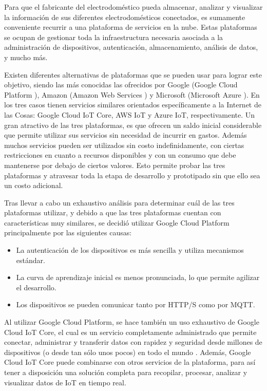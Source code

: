 Para que el fabricante del electrodoméstico pueda almacenar, analizar y visualizar la información de sus diferentes electrodomésticos conectados, es sumamente conveniente recurrir a una plataforma de servicios en la nube. Estas plataformas se ocupan de gestionar toda la infraestructura necesaria asociada a la administración de dispositivos, autenticación, almacenamiento, análisis de datos, y mucho más.

Existen diferentes alternativas de plataformas que se pueden usar para lograr este objetivo, siendo las más conocidas las ofrecidos por Google (Google Cloud Platform \citep{google_cloud_platform}), Amazon (Amazon Web Services \citep{aws}) y Microsoft (Microsoft Azure \citep{microsoft_azure}). En los tres casos tienen servicios similares orientados específicamente a la Internet de las Cosas: Google Cloud IoT Core, AWS IoT y Azure IoT, respectivamente. Un gran atractivo de las tres plataformas, es que ofrecen un saldo inicial considerable que permite utilizar sus servicios sin necesidad de incurrir en gastos. Además muchos servicios pueden ser utilizados sin costo indefinidamente, con ciertas restricciones en cuanto a recursos disponibles y con un consumo que debe mantenerse por debajo de ciertos valores. Esto permite probar las tres plataformas y atravesar toda la etapa de desarrollo y prototipado sin que ello sea un costo adicional. 

Tras llevar a cabo un exhaustivo análisis para determinar cuál de las tres plataformas utilizar, y debido a que las tres plataformas cuentan con características muy similares, se decidió utilizar Google Cloud Platform principalmente por las siguientes causas:

\begin{itemize}
	\item La autenticación de los dispositivos es más sencilla y utiliza mecanismos estándar. 
	\item La curva de aprendizaje inicial es menos pronunciada, lo que permite agilizar el desarrollo.
	\item Los dispositivos se pueden comunicar tanto por HTTP/S como por MQTT.
\end{itemize}

Al utilizar Google Cloud Platform, se hace también un uso exhaustivo de Google Cloud IoT Core, el cual es un servicio completamente administrado que permite conectar, administrar y transferir datos con rapidez y seguridad desde millones de dispositivos (o desde tan sólo unos pocos) en todo el mundo \citep{iot_core}. Además, Google Cloud IoT Core puede combinarse con otros servicios de la plataforma, para así tener a disposición una solución completa para recopilar, procesar, analizar y visualizar datos de IoT en tiempo real.

